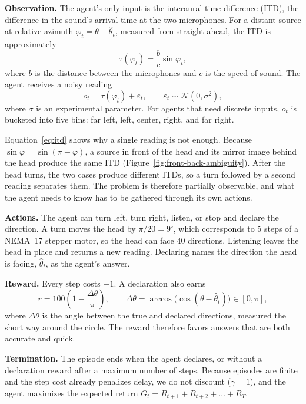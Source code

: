 \documentclass{article}
\begin{document}
\textbf{Observation.} The agent's only input is the interaural time difference
(ITD), the difference in the sound's arrival time at the two microphones. For
a distant source at relative azimuth $\varphi_t = \theta - \hat\theta_t$,
measured from straight ahead, the ITD is approximately
\begin{equation}
  \tau(\varphi_t) = \frac{b}{c} \sin \varphi_t ,
  \label{eq:itd}
\end{equation}
where $b$ is the distance between the microphones and $c$ is the speed of
sound. The agent receives a noisy reading
\begin{equation}
  o_t = \tau(\varphi_t) + \varepsilon_t, \qquad
  \varepsilon_t \sim \mathcal{N}(0, \sigma^2),
\end{equation}
where $\sigma$ is an experimental parameter. For agents that need discrete
inputs, $o_t$ is bucketed into five bins: far left, left, center, right, and
far right.

Equation~\ref{eq:itd} shows why a single reading is not enough. Because
$\sin\varphi = \sin(\pi - \varphi)$, a source in front of the head and its
mirror image behind the head produce the same ITD
(Figure~\ref{fig:front-back-ambiguity}). After the head turns, the two cases
produce different ITDs, so a turn followed by a second reading separates them.
The problem is therefore partially observable, and what the agent needs to
know has to be gathered through its own actions.

\textbf{Actions.} The agent can turn left, turn right, listen, or stop and
declare the direction. A turn moves the head by $\pi/20 = 9^\circ$, which
corresponds to 5 steps of a NEMA~17 stepper motor, so the head can face 40
directions. Listening leaves the head in place and returns a new reading.
Declaring names the direction the head is facing, $\hat\theta_t$, as the
agent's answer.

\textbf{Reward.} Every step costs $-1$. A declaration also earns
\begin{equation}
  r = 100\left(1 - \frac{\Delta\theta}{\pi}\right), \qquad
  \Delta\theta = \arccos\bigl(\cos(\theta - \hat\theta_t)\bigr) \in [0, \pi],
\end{equation}
where $\Delta\theta$ is the angle between the true and declared directions,
measured the short way around the circle. The reward therefore favors answers
that are both accurate and quick.

\textbf{Termination.} The episode ends when the agent declares, or without a
declaration reward after a maximum number of steps. Because episodes are
finite and the step cost already penalizes delay, we do not discount
($\gamma = 1$), and the agent maximizes the expected return
$G_t = R_{t+1} + R_{t+2} + \dots + R_T$.
\end{document}
